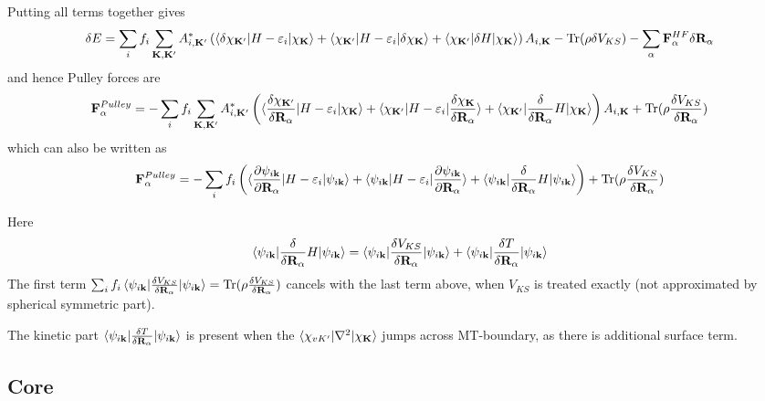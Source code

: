 \documentclass[aps,prb,floatfix,epsfig,singlecolumn,showpacs,preprintnumbers]{revtex4}
\newcommand{\vR}{{\mathbf{R}}}
\newcommand{\vF}{{\mathbf{F}}}
\newcommand{\vk}{{\mathbf{k}}}
\newcommand{\vK}{{\mathbf{K}}}
\newcommand{\Tr}{\mathrm{Tr}}
\begin{document}
Putting all terms together gives
\begin{eqnarray}
\delta E = \sum_i f_i \sum_{\vK,\vK'} A_{i,\vK'}^* 
\left(
\braket{\delta  \chi_{\vK'}|H-\varepsilon_i|\chi_{\vK}}+\braket{\chi_{\vK'}|H-\varepsilon_i|\delta\chi_{\vK}}+\braket{\chi_{\vK'}|\delta  H|\chi_{\vK}}
\right)A_{i,\vK} - \Tr(\rho \delta V_{KS})-\sum_\alpha\vF^{HF}_\alpha\delta \vR_\alpha
\end{eqnarray}
and hence Pulley forces are
\begin{eqnarray}
\vF^{Pulley}_\alpha = -\sum_i f_i \sum_{\vK,\vK'} A_{i,\vK'}^* 
\left(
\braket{\frac{\delta \chi_{\vK'}}{\delta\vR_\alpha}  |H-\varepsilon_i|\chi_{\vK}}+
\braket{\chi_{\vK'}|H-\varepsilon_i|\frac{\delta\chi_{\vK}}{\delta\vR_\alpha}}+
\braket{\chi_{\vK'}|\frac{\delta}{\delta\vR_\alpha} H|\chi_{\vK}}\right)A_{i,\vK} 
+\Tr(\rho \frac{\delta V_{KS}}{\delta\vR_\alpha})
\end{eqnarray}
which can also be written as
\begin{eqnarray}
\vF^{Pulley}_\alpha = -\sum_i f_i
\left(
\braket{\frac{\partial \psi_{i\vk}}{\partial\vR_\alpha}  |H-\varepsilon_i|\psi_{i\vk}}+
\braket{\psi_{i\vk}|H-\varepsilon_i|\frac{\partial\psi_{i\vk}}{\partial\vR_\alpha}}+
\braket{\psi_{i\vk}|\frac{\delta}{\delta\vR_\alpha} H|\psi_{i\vk}}\right)
+\Tr(\rho \frac{\delta V_{KS}}{\delta\vR_\alpha})
\end{eqnarray}

Here 
\begin{eqnarray}
\braket{\psi_{i\vk}|\frac{\delta}{\delta\vR_\alpha}  H|\psi_{i\vk}}=
\braket{\psi_{i\vk}|\frac{\delta V_{KS}}{\delta\vR_\alpha} |\psi_{i\vk}}+
\braket{\psi_{i\vk}|\frac{\delta T}{\delta\vR_\alpha} |\psi_{i\vk}}
\end{eqnarray}
The first term $\sum_i f_i \braket{\psi_{i\vk}|\frac{\delta   V_{KS}}{\delta\vR_\alpha} |\psi_{i\vk}}=\Tr(\rho \frac{\delta V_{KS}}{\delta\vR_\alpha})$
cancels with the last term above, when $V_{KS}$ is treated exactly (not approximated by
spherical symmetric part).

The kinetic part $\braket{\psi_{i\vk}|\frac{\delta  T}{\delta\vR_\alpha} |\psi_{i\vk}}$ is present when the 
$\braket{\chi_{vK'}|\nabla^2|\chi_{\vK}}$ jumps across MT-boundary, as there is
additional surface term.


\subsection{Core}
\end{document}
